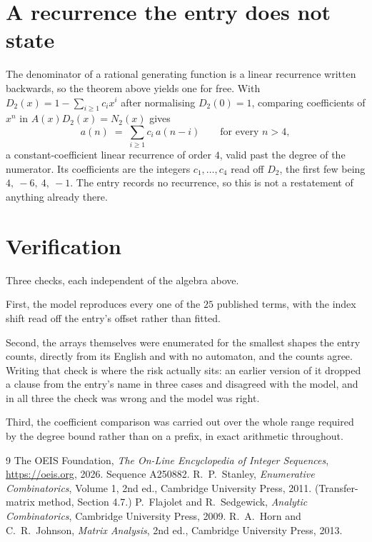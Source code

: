 \documentclass[11pt,a4paper]{article}
\theoremstyle{plain}
\theoremstyle{definition}
\begin{document}
\section{A recurrence the entry does not state}

The denominator of a rational generating function is a linear recurrence written backwards, so
the theorem above yields one for free. With $D_2(x)=1-\sum_{i\ge1}c_ix^i$ after normalising
$D_2(0)=1$, comparing coefficients of $x^n$ in $A(x)D_2(x)=N_2(x)$ gives
\[
a(n)\;=\;\sum_{i\ge1}c_i\,a(n-i)\qquad\text{for every }n>4,
\]
a constant-coefficient linear recurrence of order $4$, valid past the degree of the
numerator. Its coefficients are the integers $c_1,\dots,c_{4}$ read off $D_2$, the first few being $4,\ -6,\ 4,\ -1$. The entry records no recurrence, so this is not a restatement of anything
already there.

\section{Verification}

Three checks, each independent of the algebra above.

First, the model reproduces every one of the $25$ published terms, with the index shift
read off the entry's offset rather than fitted.

Second, the arrays themselves were enumerated for the smallest shapes the entry counts,
directly from its English and with no automaton, and the counts agree. Writing that check is
where the risk actually sits: an earlier version of it dropped a clause from the entry's name
in three cases and disagreed with the model, and in all three the check was wrong and the model
was right.

Third, the coefficient comparison was carried out over the whole range required by the degree
bound rather than on a prefix, in exact arithmetic throughout.

\begin{thebibliography}{9}
 The OEIS Foundation, \emph{The On-Line Encyclopedia of Integer
Sequences}, \url{https://oeis.org}, 2026. Sequence A250882.
 R.~P.~Stanley, \emph{Enumerative Combinatorics}, Volume 1, 2nd ed.,
Cambridge University Press, 2011. (Transfer-matrix method, Section 4.7.)
 P.~Flajolet and R.~Sedgewick, \emph{Analytic Combinatorics}, Cambridge
University Press, 2009.
 R.~A.~Horn and C.~R.~Johnson, \emph{Matrix Analysis}, 2nd ed., Cambridge
University Press, 2013.
\end{thebibliography}
\end{document}
